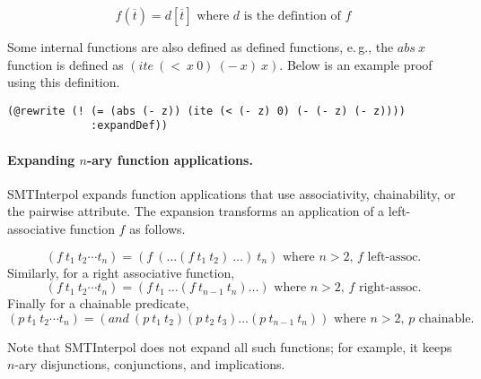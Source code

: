 \documentclass[a4paper]{article}
\newcommand\si{SMTInterpol\xspace}
\begin{document}
\begin{equation}
f(\overline{t}) = d[\overline{t}]
\text{ where $d$ is the defintion of $f$} \tag{expandDef}
\end{equation}

Some internal functions are also defined as defined functions,
e.\,g., the $abs\ x$ function is defined as $(ite\ (<\ x\ 0)\ (-\ x)\ x)$. Below is an example proof using this definition.
\begin{verbatim}
(@rewrite (! (= (abs (- z)) (ite (< (- z) 0) (- (- z) (- z))))
             :expandDef))
\end{verbatim}

\paragraph{Expanding $n$-ary function applications.}  \si expands function
applications that use associativity, chainability, or the pairwise attribute.
The expansion transforms an application of a left-associative function $f$ as follows.

\begin{equation*}
  (f\ t_1\ t_2 \cdots t_n) = (f\ (\ldots (f\ t_1\ t_2)\ \ldots)\ t_n)
  \text{ where $n > 2$, $f$ left-assoc.}
  \tag{expand}
\end{equation*}
Similarly, for a right associative function,
\begin{equation*}
  (f\ t_1\ t_2 \cdots t_n) = (f\ t_1\ \ldots (f\ t_{n-1}\ t_n)\ldots)
  \text{ where $n > 2$, $f$ right-assoc.}
  \tag{expand}
\end{equation*}
Finally for a chainable predicate,
\begin{equation*}
  (p\ t_1\ t_2 \cdots t_n) = (and\ (p\ t_1\ t_2) (p\ t_2\ t_3) \ldots (p\ t_{n-1}\ t_n))
  \text{ where $n > 2$, $p$ chainable.}
  \tag{expand}
\end{equation*}

Note that \si does not expand all such functions; for example, it
keeps $n$-ary disjunctions, conjunctions, and implications.
\end{document}
